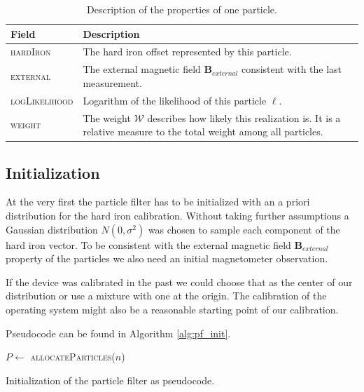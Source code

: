 \begin{table}[h]
    \centering
    \begin{tabular}{ | l | p{10cm} | }
    \hline
    \textbf{Field}             & \textbf{Description} \\ \hline
    \textsc{hardIron}          & The hard iron offset represented by this particle. \\ \hline
    \textsc{external}          & The external magnetic field $\bm{B}_{external}$ consistent with the last measurement. \\ \hline
    \textsc{logLikelihood}     & Logarithm of the likelihood of this particle $\ell$. \\ \hline
    \textsc{weight}            & The weight $\mathcal{W}$ describes how likely this realization is. It is a relative measure to the total weight among all particles. \\ \hline
    \end{tabular}
    \caption{Description of the properties of one particle.}
    \label{tbl:one_particle}
\end{table}

\subsection{Initialization}

At the very first the particle filter has to be initialized with an a priori distribution for the hard iron calibration. Without taking further assumptions a Gaussian distribution $N(0, \sigma^2)$ was chosen to sample each component of the hard iron vector. To be consistent with the external magnetic field $\bm{B}_{external}$ property of the particles we also need an initial magnetometer observation.

If the device was calibrated in the past we could choose that as the center of our distribution or use a mixture with one at the origin. The calibration of the operating system might also be a reasonable starting point of our calibration.

Pseudocode can be found in Algorithm \ref{alg:pf_init}.

\begin{algorithm}[h]
	$P \leftarrow$ \textsc{allocateParticles}($n$)\\
	\caption{Initialization of the particle filter as pseudocode.}
	\label{alg:pf_init}
\end{algorithm}


